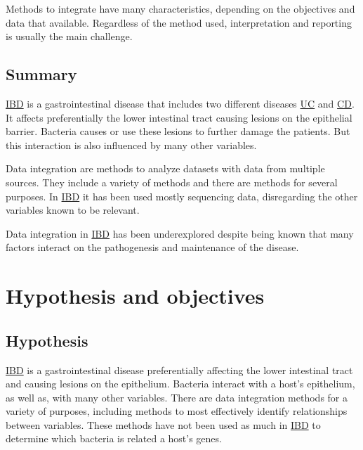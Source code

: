 \documentclass[
  12pt,
  a4paper,
  twoside,
  openright]{book}
\begin{document}
Methods to integrate have many characteristics, depending on the objectives and data that available.
Regardless of the method used, interpretation and reporting is usually the main challenge.

\hypertarget{summary}{%
\section{Summary}\label{summary}}

\protect\hyperlink{acronyms_IBD}{IBD} is a gastrointestinal disease that includes two different diseases \protect\hyperlink{acronyms_UC}{UC} and \protect\hyperlink{acronyms_CD}{CD}.
It affects preferentially the lower intestinal tract causing lesions on the epithelial barrier.
Bacteria causes or use these lesions to further damage the patients.
But this interaction is also influenced by many other variables.

Data integration are methods to analyze datasets with data from multiple sources.
They include a variety of methods and there are methods for several purposes.
In \protect\hyperlink{acronyms_IBD}{IBD} it has been used mostly sequencing data, disregarding the other variables known to be relevant.

Data integration in \protect\hyperlink{acronyms_IBD}{IBD} has been underexplored despite being known that many factors interact on the pathogenesis and maintenance of the disease.

\hypertarget{hypothesis-and-objectives}{%
\chapter{Hypothesis and objectives}\label{hypothesis-and-objectives}}

\hypertarget{hypothesis}{%
\section{Hypothesis}\label{hypothesis}}

\protect\hyperlink{acronyms_IBD}{IBD} is a gastrointestinal disease preferentially affecting the lower intestinal tract and causing lesions on the epithelium.
Bacteria interact with a host's epithelium, as well as, with many other variables.
There are data integration methods for a variety of purposes, including methods to most effectively identify relationships between variables.
These methods have not been used as much in \protect\hyperlink{acronyms_IBD}{IBD} to determine which bacteria is related a host's genes.
\end{document}
